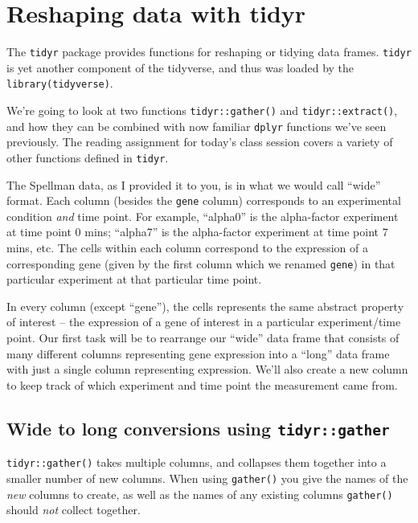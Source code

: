 \documentclass[]{book}
\theoremstyle{definition}
\theoremstyle{definition}
\theoremstyle{definition}
\theoremstyle{remark}
\begin{document}
\hypertarget{reshaping-data-with-tidyr}{%
\section{Reshaping data with tidyr}\label{reshaping-data-with-tidyr}}

The \texttt{tidyr} package provides functions for reshaping or tidying
data frames. \texttt{tidyr} is yet another component of the tidyverse,
and thus was loaded by the \texttt{library(tidyverse)}.

We're going to look at two functions \texttt{tidyr::gather()} and
\texttt{tidyr::extract()}, and how they can be combined with now
familiar \texttt{dplyr} functions we've seen previously. The reading
assignment for today's class session covers a variety of other functions
defined in \texttt{tidyr}.

The Spellman data, as I provided it to you, is in what we would call
``wide'' format. Each column (besides the \texttt{gene} column)
corresponds to an experimental condition \emph{and} time point. For
example, ``alpha0'' is the alpha-factor experiment at time point 0 mins;
``alpha7'' is the alpha-factor experiment at time point 7 mins, etc. The
cells within each column correspond to the expression of a corresponding
gene (given by the first column which we renamed \texttt{gene}) in that
particular experiment at that particular time point.

In every column (except ``gene''), the cells represents the same
abstract property of interest -- the expression of a gene of interest in
a particular experiment/time point. Our first task will be to rearrange
our ``wide'' data frame that consists of many different columns
representing gene expression into a ``long'' data frame with just a
single column representing expression. We'll also create a new column to
keep track of which experiment and time point the measurement came from.

\hypertarget{wide-to-long-conversions-using-tidyrgather}{%
\subsection{\texorpdfstring{Wide to long conversions using
\texttt{tidyr::gather}}{Wide to long conversions using tidyr::gather}}\label{wide-to-long-conversions-using-tidyrgather}}

\texttt{tidyr::gather()} takes multiple columns, and collapses them
together into a smaller number of new columns. When using
\texttt{gather()} you give the names of the \emph{new} columns to
create, as well as the names of any existing columns \texttt{gather()}
should \emph{not} collect together.
\end{document}
